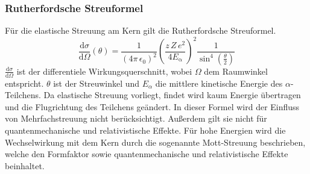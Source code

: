 \subsubsection{Rutherfordsche Streuformel}
Für die elastische Streuung am Kern gilt die Rutherfordsche Streuformel.
\begin{equation}
  \label{eqn:rutherford}
\frac{\mathrm{d}\sigma}{\mathrm{d}\Omega}(\theta)=\frac{1}{(4\pi\,\epsilon_0)^2}\left(\frac{z\,Z\,e^2}{4E_\mathrm{\alpha}}\right)^2 \frac{1}{\sin^4\left(\frac{\theta}{2}\right)}
\end{equation}
$\frac{\mathrm{d}\sigma}{\mathrm{d}\Omega}$ ist der differentiele Wirkungsquerschnitt, wobei $\Omega$ dem Raumwinkel entspricht. $\theta$ ist der Streuwinkel und $E_{\alpha}$ die mittlere kinetische Energie des $\alpha$-Teilchens. Da elastische Streuung vorliegt, findet wird kaum Energie übertragen und die Flugrichtung des Teilchens geändert.
In dieser Formel wird der Einfluss von Mehrfachstreuung nicht berücksichtigt. Außerdem gilt sie nicht für quantenmechanische und relativistische Effekte. Für hohe Energien wird die
Wechselwirkung mit dem Kern durch die sogenannte Mott-Streuung beschrieben, welche den Formfaktor sowie quantenmechanische und relativistische Effekte beinhaltet.
